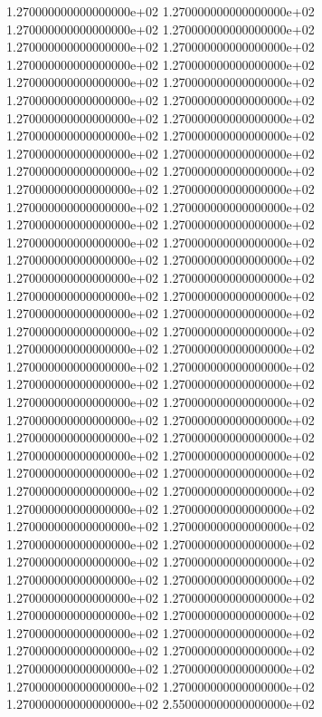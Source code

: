 1.270000000000000000e+02 1.270000000000000000e+02 1.270000000000000000e+02 1.270000000000000000e+02 1.270000000000000000e+02 1.270000000000000000e+02 1.270000000000000000e+02 1.270000000000000000e+02 1.270000000000000000e+02 1.270000000000000000e+02 1.270000000000000000e+02 1.270000000000000000e+02 1.270000000000000000e+02 1.270000000000000000e+02 1.270000000000000000e+02 1.270000000000000000e+02 1.270000000000000000e+02 1.270000000000000000e+02 1.270000000000000000e+02 1.270000000000000000e+02 1.270000000000000000e+02 1.270000000000000000e+02 1.270000000000000000e+02 1.270000000000000000e+02 1.270000000000000000e+02 1.270000000000000000e+02 1.270000000000000000e+02 1.270000000000000000e+02 1.270000000000000000e+02 1.270000000000000000e+02 1.270000000000000000e+02 1.270000000000000000e+02 1.270000000000000000e+02 1.270000000000000000e+02 1.270000000000000000e+02 1.270000000000000000e+02 1.270000000000000000e+02 1.270000000000000000e+02 1.270000000000000000e+02 1.270000000000000000e+02 1.270000000000000000e+02 1.270000000000000000e+02 1.270000000000000000e+02 1.270000000000000000e+02 1.270000000000000000e+02 1.270000000000000000e+02 1.270000000000000000e+02 1.270000000000000000e+02 1.270000000000000000e+02 1.270000000000000000e+02 1.270000000000000000e+02 1.270000000000000000e+02 1.270000000000000000e+02 1.270000000000000000e+02 1.270000000000000000e+02 1.270000000000000000e+02 1.270000000000000000e+02 1.270000000000000000e+02 1.270000000000000000e+02 1.270000000000000000e+02 1.270000000000000000e+02 1.270000000000000000e+02 1.270000000000000000e+02 1.270000000000000000e+02 1.270000000000000000e+02 1.270000000000000000e+02 1.270000000000000000e+02 1.270000000000000000e+02 1.270000000000000000e+02 1.270000000000000000e+02 1.270000000000000000e+02 1.270000000000000000e+02 1.270000000000000000e+02 1.270000000000000000e+02 1.270000000000000000e+02 1.270000000000000000e+02 1.270000000000000000e+02 1.270000000000000000e+02 1.270000000000000000e+02 2.550000000000000000e+02
